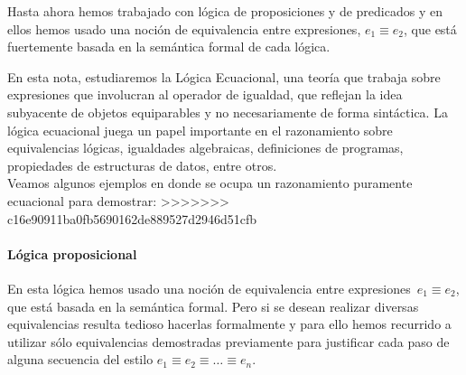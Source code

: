 \documentclass[11pt,letterpaper]{article}
\begin{document}
% 
% 
% 


Hasta ahora hemos trabajado con l\'ogica de proposiciones y de predicados
y en ellos hemos usado una noci\'on de equivalencia entre expresiones, 
$e_1 \equiv e_2$, que est\'a fuertemente basada en la sem\'antica formal de 
cada l\'ogica.


 
En esta nota, estudiaremos la Lógica Ecuacional, 
una teoría que trabaja sobre expresiones que involucran al operador de 
igualdad, que reflejan la idea subyacente de objetos equiparables y no 
necesariamente de forma sint\'actica. 
La lógica ecuacional juega un papel importante en el razonamiento sobre 
equivalencias lógicas, igualdades algebraicas, definiciones de programas, 
propiedades de estructuras de datos, entre otros.  \\
Veamos algunos ejemplos en donde se ocupa un razonamiento puramente 
ecuacional para demostrar:
>>>>>>> c16e90911ba0fb5690162de889527d2946d51cfb

\paragraph{L\'ogica proposicional}
En esta lógica hemos usado una noci\'on de equivalencia entre 
expresiones~$e_1 \equiv e_2$, que est\'a  basada en la sem\'antica formal. 
Pero si se desean realizar diversas equivalencias resulta tedioso hacerlas 
formalmente y para ello hemos recurrido a utilizar s\'olo equivalencias 
demostradas previamente para justificar cada paso de alguna secuencia
del estilo $e_1 \equiv e_2 \equiv \ldots \equiv e_n$.\\
\end{document}
